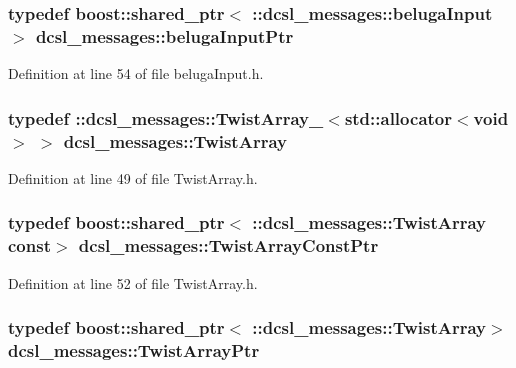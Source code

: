 \subsubsection[{beluga\-Input\-Ptr}]{\setlength{\rightskip}{0pt plus 5cm}typedef boost\-::shared\-\_\-ptr$<$ \-::{\bf dcsl\-\_\-messages\-::beluga\-Input}$>$ {\bf dcsl\-\_\-messages\-::beluga\-Input\-Ptr}}\label{namespacedcsl__messages_a496d32e6f48704627157a768aff69eaa}


\-Definition at line 54 of file beluga\-Input.\-h.

\subsubsection[{\-Twist\-Array}]{\setlength{\rightskip}{0pt plus 5cm}typedef \-::{\bf dcsl\-\_\-messages\-::\-Twist\-Array\-\_\-}$<$std\-::allocator$<$void$>$ $>$ {\bf dcsl\-\_\-messages\-::\-Twist\-Array}}\label{namespacedcsl__messages_ae080f2840b4047dfc36e5e2d9ddea6dd}


\-Definition at line 49 of file \-Twist\-Array.\-h.

\subsubsection[{\-Twist\-Array\-Const\-Ptr}]{\setlength{\rightskip}{0pt plus 5cm}typedef boost\-::shared\-\_\-ptr$<$ \-::{\bf dcsl\-\_\-messages\-::\-Twist\-Array} const$>$ {\bf dcsl\-\_\-messages\-::\-Twist\-Array\-Const\-Ptr}}\label{namespacedcsl__messages_ad97b1d7c5d2837b4bf75c2ad2dddf357}


\-Definition at line 52 of file \-Twist\-Array.\-h.

\subsubsection[{\-Twist\-Array\-Ptr}]{\setlength{\rightskip}{0pt plus 5cm}typedef boost\-::shared\-\_\-ptr$<$ \-::{\bf dcsl\-\_\-messages\-::\-Twist\-Array}$>$ {\bf dcsl\-\_\-messages\-::\-Twist\-Array\-Ptr}}\label{namespacedcsl__messages_a89b2c91c66ea4850948805eced98bdd3}


